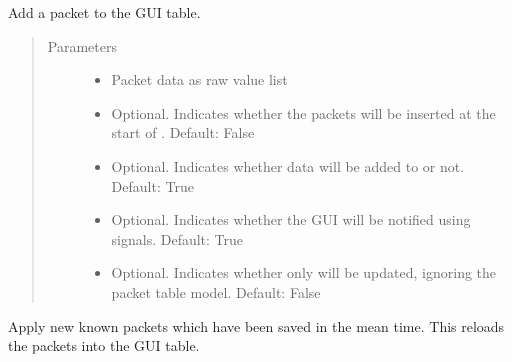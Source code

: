 \documentclass[letterpaper,10pt,english]{sphinxmanual}
\begin{document}
\begin{fulllineitems}
\begin{fulllineitems}
\end{fulllineitems}


\begin{fulllineitems}
\label{\detokenize{src:src.AbstractTab.AbstractTab.addPacket}}
Add a packet to the GUI table.
\begin{quote}\begin{description}
\item[{Parameters}] \leavevmode\begin{itemize}
\item {} 
 \textendash{} Packet data as raw value list

\item {} 
 \textendash{} Optional. Indicates whether the packets will be inserted at the start of .
Default: False

\item {} 
 \textendash{} Optional. Indicates whether data will be added to  or not. Default: True

\item {} 
 \textendash{} Optional. Indicates whether the GUI will be notified using signals. Default: True

\item {} 
 \textendash{} Optional. Indicates whether only  will be updated, ignoring
the packet table model. Default: False

\end{itemize}

\end{description}\end{quote}

\end{fulllineitems}


\begin{fulllineitems}
\label{\detokenize{src:src.AbstractTab.AbstractTab.applyNewKnownPackets}}
Apply new known packets which have been saved in the mean time. This reloads the packets into the GUI table.


\end{fulllineitems}
\end{fulllineitems}
\end{document}
